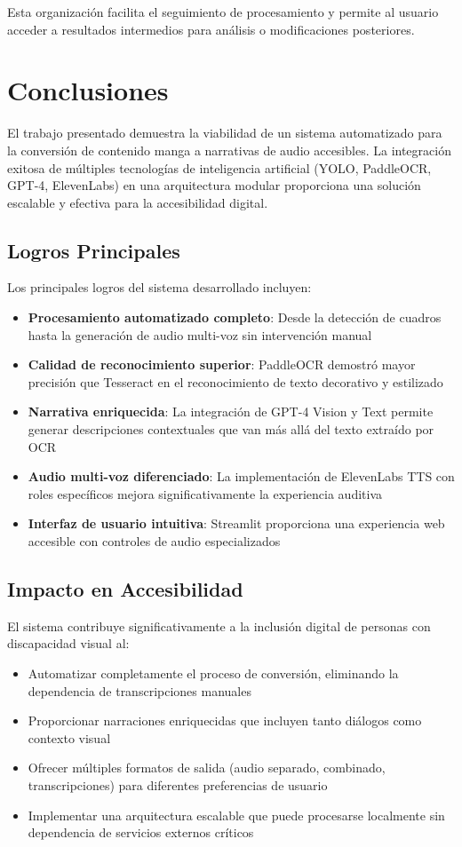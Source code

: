 \documentclass[conference]{IEEEtran}
\begin{document}
Esta organización facilita el seguimiento de procesamiento y permite al usuario acceder a resultados intermedios para análisis o modificaciones posteriores.

\section{Conclusiones}
El trabajo presentado demuestra la viabilidad de un sistema automatizado para la conversión de contenido manga a narrativas de audio accesibles. La integración exitosa de múltiples tecnologías de inteligencia artificial (YOLO, PaddleOCR, GPT-4, ElevenLabs) en una arquitectura modular proporciona una solución escalable y efectiva para la accesibilidad digital.

\subsection{Logros Principales}
Los principales logros del sistema desarrollado incluyen:
\begin{itemize}
\item \textbf{Procesamiento automatizado completo}: Desde la detección de cuadros hasta la generación de audio multi-voz sin intervención manual
\item \textbf{Calidad de reconocimiento superior}: PaddleOCR demostró mayor precisión que Tesseract en el reconocimiento de texto decorativo y estilizado
\item \textbf{Narrativa enriquecida}: La integración de GPT-4 Vision y Text permite generar descripciones contextuales que van más allá del texto extraído por OCR
\item \textbf{Audio multi-voz diferenciado}: La implementación de ElevenLabs TTS con roles específicos mejora significativamente la experiencia auditiva
\item \textbf{Interfaz de usuario intuitiva}: Streamlit proporciona una experiencia web accesible con controles de audio especializados
\end{itemize}

\subsection{Impacto en Accesibilidad}
El sistema contribuye significativamente a la inclusión digital de personas con discapacidad visual al:
\begin{itemize}
\item Automatizar completamente el proceso de conversión, eliminando la dependencia de transcripciones manuales
\item Proporcionar narraciones enriquecidas que incluyen tanto diálogos como contexto visual
\item Ofrecer múltiples formatos de salida (audio separado, combinado, transcripciones) para diferentes preferencias de usuario
\item Implementar una arquitectura escalable que puede procesarse localmente sin dependencia de servicios externos críticos
\end{itemize}
\end{document}
